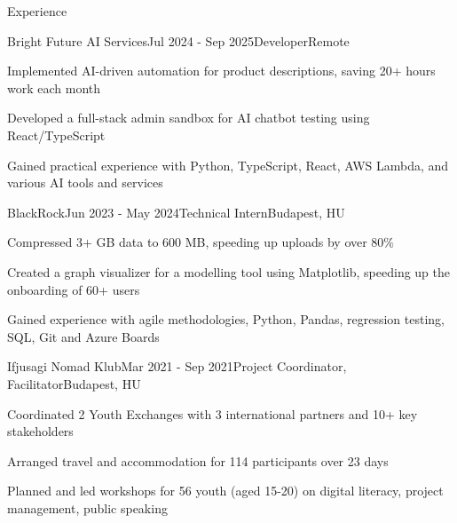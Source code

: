 \documentclass[
	a4paper, %
	11pt, %
]{resume} %
\begin{document}
\begin{rSection}{Experience}

	\begin{rSubsection}{Bright Future AI Services}{Jul 2024 - Sep 2025}{Developer}{Remote}
		\item Implemented AI-driven automation for product descriptions, saving 20+ hours work each month
		\item Developed a full-stack admin sandbox for AI chatbot testing using React/TypeScript
		\item Gained practical experience with Python, TypeScript, React, AWS Lambda, and various AI tools and services
	\end{rSubsection}

	\begin{rSubsection}{BlackRock}{Jun 2023 - May 2024}{Technical Intern}{Budapest, HU}
		\item Compressed 3+ GB data to 600 MB, speeding up uploads by over 80\%
		\item Created a graph visualizer for a modelling tool using Matplotlib, speeding up the onboarding of 60+ users
		\item Gained experience with agile methodologies, Python, Pandas, regression testing, SQL, Git and Azure Boards
	\end{rSubsection}

	\begin{rSubsection}{Ifjusagi Nomad Klub}{Mar 2021 - Sep 2021}{Project Coordinator, Facilitator}{Budapest, HU}
		\item Coordinated 2 Youth Exchanges with 3 international partners and 10+ key stakeholders
		\item Arranged travel and accommodation for 114 participants over 23 days
		\item Planned and led workshops for 56 youth (aged 15-20) on digital literacy, project management, public speaking
	\end{rSubsection}

\end{rSection}

\end{document}
